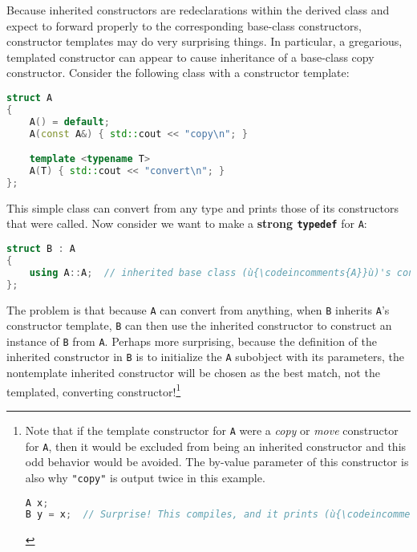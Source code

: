 Because inherited constructors are redeclarations within the derived class and expect to forward properly to the corresponding base-class constructors, constructor templates may do very surprising things. In particular, a gregarious, templated constructor can appear to cause inheritance of a base-class copy constructor. Consider the following class with a constructor template:
\begin{lstlisting}[language=C++]
struct A
{
    A() = default;
    A(const A&) { std::cout << "copy\n"; }

    template <typename T>
    A(T) { std::cout << "convert\n"; }
};
\end{lstlisting}
    This simple class can convert from any type and prints those of its constructors that were called. Now consider we want to make a \textbf{strong \texttt{typedef}} for \texttt{A}:
\begin{lstlisting}[language=C++]
struct B : A
{
    using A::A;  // inherited base class (ù{\codeincomments{A}}ù)'s constructors
};
\end{lstlisting}
    The problem is that because \texttt{A} can convert from anything, when \texttt{B} inherits \texttt{A}'s constructor template, \texttt{B} can then use the inherited constructor to construct an instance of \texttt{B} from \texttt{A}. Perhaps more surprising, because the definition of the inherited constructor in \texttt{B} is to initialize the \texttt{A} subobject with its parameters, the nontemplate inherited constructor will be chosen as the best match, not the templated, converting constructor!\cprotect\footnote{Note that if the template constructor for \texttt{A} were a \emph{copy} or \emph{move} constructor for \texttt{A}, then it would be excluded from being an inherited constructor and this odd behavior would be avoided. The by-value parameter of this constructor is also why \texttt{"copy"} is output twice in this example.
\begin{lstlisting}[language=C++, basicstyle={\ttfamily\footnotesize}]
A x;
B y = x;  // Surprise! This compiles, and it prints (ù{\codeincomments{"copy"}}ù) twice!
\end{lstlisting}
    }

